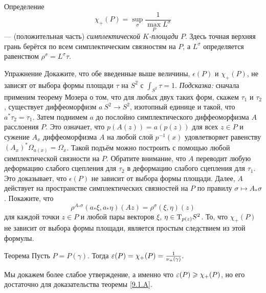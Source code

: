 \begin{ex*}{Определение}
\[\chi_+ (P) = \sup_\sigma \frac1{\max_P L^\sigma}\]  — (положительная часть) \emph{симплектической $K$-площади} $P$.
Здесь точная верхняя грань берётся по всем симплектическим связностям на $P$, а $L^\sigma$ определяется равенством $\rho^\sigma = L^\sigma \tau$.
\end{ex*}

\begin{ex*}{Упражнение}
Докажите, что обе введенные выше величины, $\epsilon(P)$ и $\chi_+
(P)$, не зависят от выбора формы площади $\tau$ на $S^2$ с $\int_{S^2}
\tau = 1$. 
\emph{Подсказка:} сначала применим теорему Мозера \cite{MS} о том, что для
любых двух таких форм, скажем $\tau_1$ и $\tau_2$, существует
диффеоморфизм $a\:S^2\to S^2$, изотопный единице и такой, что $a^\ast
\tau_2 = \tau_1$.
Затем поднимем $a$ до послойно симплектического диффеоморфизма $A$ расслоения $P$.
Это означает, что $p(A(z)) = a(p(z))$ для всех $z \in P$ и сужение $A_x$ диффеоморфизма $A$ на любой слой $p^{-1} (x)$ удовлетворяет равенству $(A_x)^\ast \Omega_{a(x)} = \Omega_x$.
Такой подъём можно построить с помощью любой симплектической связности
на $P$. 
Обратите внимание, что $A$ переводит любую деформацию слабого
сцепления для $\tau_2$ в деформацию слабого сцепления для
$\tau_1$.
Это доказывает, что $\epsilon(P)$ не зависит от выбора формы площади.
Далее, $A$ действует на пространстве симплектических связностей на $P$
по правилу $\sigma \mapsto A_\ast \sigma$.
Покажите, что 
\[\rho^{A_\ast \sigma} (a_\ast \xi, a_\ast \eta)(Az) = \rho^\sigma (\xi, \eta)(z)\]
для каждой точки $z \in P$ и любой пары векторов $\xi$, $\eta \in
\mathrm{T}_{p(z)} S^2$.
То, что $\chi_+(P)$ не зависит от выбора формы площади, является
простым следствием из этой формулы.
\end{ex*}

\begin{thm}[(\cite{P4})]{Теорема}\label{9.3.B}
  Пусть $P = P(\gamma)$.
  Тогда $\epsilon(P) = \chi_+ (P) \z= \frac1{\nu_+(\gamma)}.$
\end{thm}

Мы докажем более слабое утверждение, а именно что $\epsilon(P) \z\ge
\chi_+ (P)$, но его достаточно для доказательства теоремы
\ref{9.1.A}.

